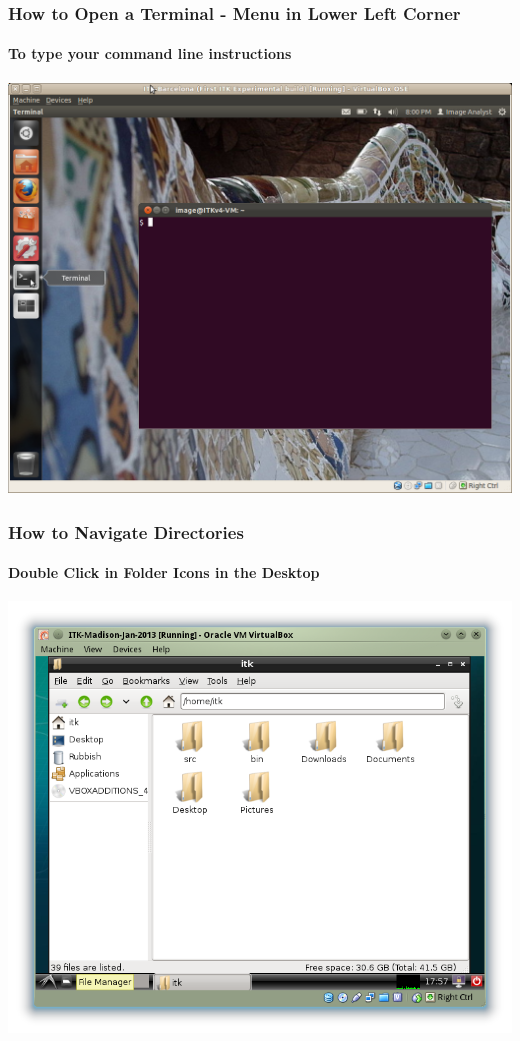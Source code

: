 {
\begin{frame}
\frametitle{How to Open a Terminal - Menu in Lower Left Corner}
\framesubtitle{To type your command line instructions}
\begin{center}
\includegraphics[width=0.7\paperwidth]{../Art/Screenshot-OpenTerminal.jpg}
\end{center}
\end{frame}
}

{
\begin{frame}
\frametitle{How to Navigate Directories}
\framesubtitle{Double Click in Folder Icons in the Desktop}
\begin{center}
\includegraphics[width=0.7\paperwidth]{../Art/Screenshot-PCManFM.png}
\end{center}
\end{frame}
}

